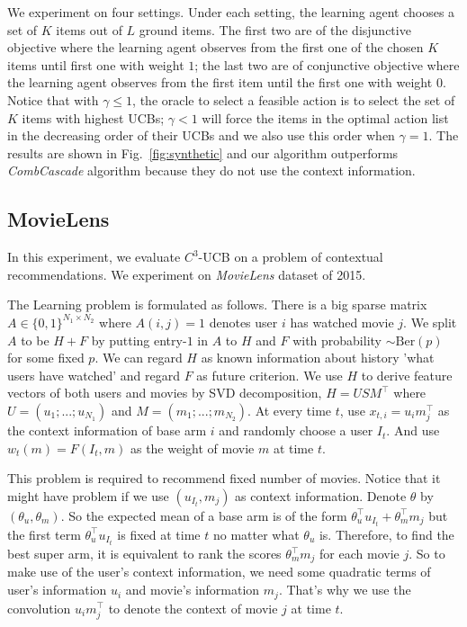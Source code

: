 \documentclass{article}
\begin{document}
We experiment on four settings. Under each setting, the learning agent chooses a set of $K$ items out of $L$ ground items. The first two are of the disjunctive objective where the learning agent observes from the first one of the chosen $K$ items until first one with weight $1$; the last two are of conjunctive objective where the learning agent observes from the first item until the first one with weight $0$. Notice that with $\gamma \leq 1$, the oracle to select a feasible action is to select the set of $K$ items with highest UCBs; $\gamma < 1$ will force the items in the optimal action list in the decreasing order of their UCBs and we also use this order when $\gamma = 1$. The results are shown in Fig.~\ref{fig:synthetic} and our algorithm outperforms {\it CombCascade} algorithm because they do not use the context information.


\subsection{MovieLens}

In this experiment, we evaluate $C^3$-UCB on a problem of contextual recommendations. We experiment on {\it MovieLens} dataset\cite{lam2013movie} of 2015.

The Learning problem is formulated as follows. There is a big sparse matrix $A \in \{0,1\}^{N_1 \times N_2}$ where $A(i,j) = 1$ denotes user $i$ has watched movie $j$. We split $A$ to be $H + F$ by putting entry-$1$ in $A$ to $H$ and $F$ with probability $\sim \mathrm{Ber}(p)$ for some fixed $p$. We can regard $H$ as known information about history 'what users have watched' and regard $F$ as future criterion. We use $H$ to derive feature vectors of both users and movies by SVD decomposition, $H = USM^{\top}$ where $U = (u_1; ...;u_{N_1})$ and $M = (m_1;...;m_{N_2})$. At every time $t$, use $x_{t,i} = u_{i}m_j^{\top}$ as the context information of base arm $i$ and randomly choose a user $I_t$. And use $w_t(m) = F(I_t,m)$ as the weight of movie $m$ at time $t$.

This problem is required to recommend fixed number of movies. Notice that it might have problem if we use $(u_{I_t}, m_j)$ as context information. Denote $\theta$ by $(\theta_u, \theta_m)$. So the expected mean of a base arm is of the form $\theta_u^{\top} u_{I_t} + \theta_m^{\top} m_j$ but the first term $\theta_u^{\top} u_{I_t}$ is fixed at time $t$ no matter what $\theta_u$ is. Therefore, to find the best super arm, it is equivalent to rank the scores $\theta_m^{\top} m_j$ for each movie $j$. So to make use of the user's context information, we need some quadratic terms of user's information $u_i$ and movie's information $m_j$. That's why we use the convolution $u_{i}m_j^{\top}$ to denote the context of movie $j$ at time $t$.
\end{document}
